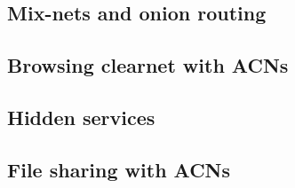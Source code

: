 \subsection{Mix-nets and onion routing}

\subsection{Browsing clearnet with ACNs}

\subsection{Hidden services}

\subsection{File sharing with ACNs}
